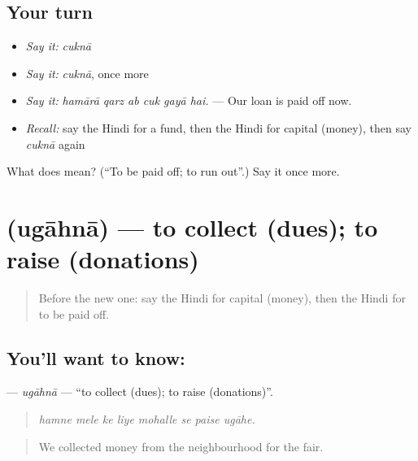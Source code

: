 \subsection*{Your turn}
\begin{itemize}
\raggedright
  \item \emph{Say it:} \emph{cuknā}
  \item \emph{Say it:} \emph{cuknā}, once more
  \item \emph{Say it:} \emph{hamārā qarz ab cuk gayā hai.} — Our loan is paid off now.
  \item \emph{Recall:} say the Hindi for a fund, then the Hindi for capital (money), then say \emph{cuknā} again
\end{itemize}

\begin{tcolorbox}[breakable,colback=teal!4,colframe=teal!35!black,title={Before you move on}]
What does  mean? (\textquotedblleft{}To be paid off; to run out\textquotedblright{}.) Say it once more.
\end{tcolorbox}
\section[\texorpdfstring{\hi{उगाहना} (ugāhnā)}{उगाहना (ugāhnā)}]{ (ugāhnā) — to collect (dues); to raise (donations)}

\label{lesson:HI-C430-ugahna}



\begin{quote}
Before the new one: say the Hindi for capital (money), then the Hindi for to be paid off.
\end{quote}

\subsection*{You'll want to know: }
\textbf{} — \emph{ugāhnā} — \textquotedblleft{}to collect (dues); to raise (donations)\textquotedblright{}.

\begin{quote}
       
\end{quote}

\begin{quote}
\emph{hamne mele ke liye mohalle se paise ugāhe.}
\end{quote}

\begin{quote}
We collected money from the neighbourhood for the fair.
\end{quote}

